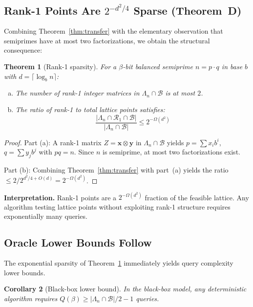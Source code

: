 \documentclass[11pt,a4paper]{article}
\newtheorem{theorem}{Theorem}
\newtheorem{corollary}[theorem]{Corollary}
\begin{document}
\subsection{Rank-1 Points Are $2^{-d^2/4}$ Sparse (Theorem~D)}

Combining Theorem~\ref{thm:transfer} with the elementary observation that semiprimes have at most two factorizations, we obtain the structural consequence:

\begin{theorem}[Rank-1 sparsity]\label{thm:sparsity}
For a $\beta$-bit balanced semiprime $n = p \cdot q$ in base $b$ with $d = \lceil \log_b n \rceil$:
\begin{enumerate}[(a)]
\item The number of rank-1 integer matrices in $\Lambda_n \cap \mathcal{B}$ is at most $2$.
\item The ratio of rank-1 to total lattice points satisfies:
\[
\frac{|\Lambda_n \cap \mathcal{R}_1 \cap \mathcal{B}|}{|\Lambda_n \cap \mathcal{B}|} \le 2^{-\Omega(d^2)}
\]
\end{enumerate}
\end{theorem}

\begin{proof}
Part (a): A rank-1 matrix $Z = \mathbf{x} \otimes \mathbf{y}$ in $\Lambda_n \cap \mathcal{B}$ yields $p = \sum x_i b^i$, $q = \sum y_j b^j$ with $pq = n$. Since $n$ is semiprime, at most two factorizations exist.

Part (b): Combining Theorem~\ref{thm:transfer} with part~(a) yields the ratio $\le 2/2^{d^2/4 + O(d)} = 2^{-\Omega(d^2)}$.
\end{proof}

\textbf{Interpretation.} Rank-1 points are a $2^{-\Omega(d^2)}$ fraction of the feasible lattice. Any algorithm testing lattice points without exploiting rank-1 structure requires exponentially many queries.

\subsection{Oracle Lower Bounds Follow}

The exponential sparsity of Theorem~\ref{thm:sparsity} immediately yields query complexity lower bounds.

\begin{corollary}[Black-box lower bound]\label{thm:bbox}
In the black-box model, any deterministic algorithm requires $Q(\beta) \ge |\Lambda_n \cap \mathcal{B}|/2 - 1$ queries.
\end{corollary}
\end{document}
